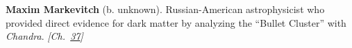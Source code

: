\textbf{Maxim Markevitch} (b. unknown). Russian-American astrophysicist who provided direct evidence for dark matter by analyzing the ``Bullet Cluster'' with \emph{Chandra}. \emph{[Ch.~\hyperref[ch:darkmatterevidence]{37}]}

